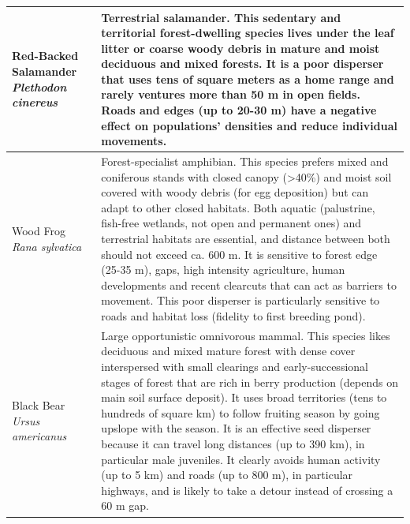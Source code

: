 \begin{longtable}[c]{|p{5cm}|p{11cm}|}
Red-Backed Salamander \newline \textit{Plethodon cinereus} & Terrestrial salamander. This sedentary and territorial forest-dwelling species lives under the leaf litter or coarse woody debris in mature and moist deciduous and mixed forests. It is a poor disperser that uses tens of square meters as a home range and rarely ventures more than 50 m in open fields. Roads and edges (up to 20-30 m) have a negative effect on populations’ densities and reduce individual movements. \\ \hline
Wood Frog \newline \textit{Rana sylvatica} & Forest-specialist amphibian. This species prefers mixed and coniferous stands with closed canopy (\textgreater 40\%) and moist soil covered with woody debris (for egg deposition) but can adapt to other closed habitats. Both aquatic (palustrine, fish-free wetlands, not open and permanent ones) and terrestrial habitats are essential, and distance between both should not exceed ca. 600 m. It is sensitive to forest edge (25-35 m), gaps, high intensity agriculture, human developments and recent clearcuts that can act as barriers to movement. This poor disperser is particularly sensitive to roads and habitat loss (fidelity to first breeding pond). \\ \hline
Black Bear \newline \textit{Ursus americanus} & Large opportunistic omnivorous mammal. This species likes deciduous and mixed mature forest with dense cover interspersed with small clearings and early-successional stages of forest that are rich in berry production (depends on main soil surface deposit). It uses broad territories (tens to hundreds of square km) to follow fruiting season by going upslope with the season. It is an effective seed disperser because it can travel long distances (up to 390 km), in particular male juveniles. It clearly avoids human activity (up to 5 km) and roads (up to 800 m), in particular highways, and is likely to take a detour instead of crossing a 60 m gap. \\
\hline
\hline
\end{longtable}



